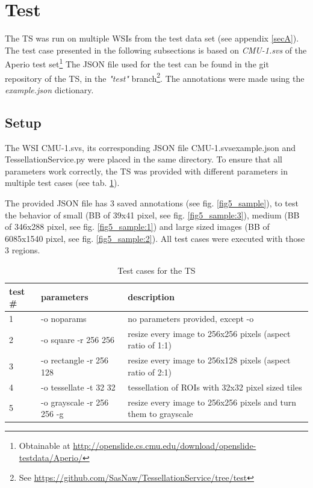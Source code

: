 \section{Test}
\label{sec5_test}
The TS was run on multiple WSIs from the test data set (see appendix \ref{secA}). The test case presented in the following subsections is based on \emph{CMU-1.svs} of the Aperio test set\footnote{
	Obtainable at \url{http://openslide.cs.cmu.edu/download/openslide-testdata/Aperio/}
} The JSON file used for the test can be found in the git repository of the TS, in the \emph{"test"} branch\footnote{
	See \url{https://github.com/SasNaw/TessellationService/tree/test}
}. The annotations were made using the \emph{example.json} dictionary.


\subsection{Setup}
\label{sec5_testSetup}
The WSI CMU-1.svs, its corresponding JSON file CMU-1.svs{\textunderscore}example.json and TessellationService.py were placed in the same directory. To ensure that all parameters work correctly, the TS was provided with different parameters in multiple test cases (see tab. \ref{tab5_tests}).

The provided JSON file has 3 saved annotations (see fig. \ref{fig5_sample}), to test the behavior of small (BB of 39x41 pixel, see fig. \ref{fig5_sample:3}), medium (BB of 346x288 pixel, see fig. \ref{fig5_sample:1}) and large sized images (BB of 6085x1540 pixel, see fig. \ref{fig5_sample:2}). All test cases were executed with those 3 regions.

\begin{table}[H]
	\begin{center}
		\begin{tabular}{| p{1.5cm} | p{3cm} |  p{5.5cm} |}
			\hline
			\textbf{test \#} & \textbf{parameters} & \textbf{description}\\ \hline
			1 & -o noparams & no parameters provided, except -o \\ \hline
			2 & -o square -r 256 256 & resize every image to 256x256 pixels (aspect ratio of 1:1)\\ \hline
			3 & -o rectangle -r 256 128 & resize every image to 256x128 pixels (aspect ratio of 2:1) \\ \hline
			4 & -o tessellate -t 32 32 & tessellation of ROIs with 32x32 pixel sized tiles \\ \hline
			5 & -o grayscale -r 256 256 -g & resize every image to 256x256 pixels and turn them to grayscale\\ \hline
		\end{tabular}
		\caption{Test cases for the TS}
		\label{tab5_tests}
	\end{center}
\end{table}

